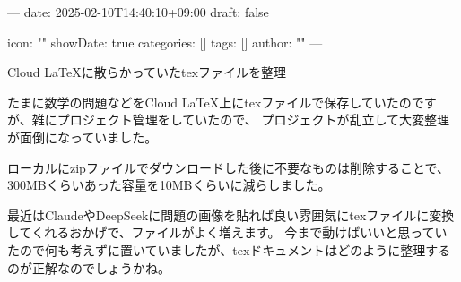 ---
date: 2025-02-10T14:40:10+09:00
draft: false

icon: ""
showDate: true
categories: []
tags: []
author: ""
---

Cloud LaTeXに散らかっていたtexファイルを整理

たまに数学の問題などをCloud LaTeX上にtexファイルで保存していたのですが、雑にプロジェクト管理をしていたので、
プロジェクトが乱立して大変整理が面倒になっていました。

ローカルにzipファイルでダウンロードした後に不要なものは削除することで、300MBくらいあった容量を10MBくらいに減らしました。

最近はClaudeやDeepSeekに問題の画像を貼れば良い雰囲気にtexファイルに変換してくれるおかげで、ファイルがよく増えます。
今まで動けばいいと思っていたので何も考えずに置いていましたが、texドキュメントはどのように整理するのが正解なのでしょうかね。
